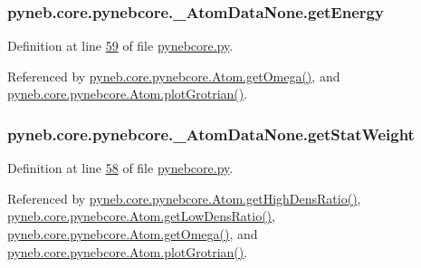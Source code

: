 \hypertarget{classpyneb_1_1core_1_1pynebcore_1_1___atom_data_none_ace59c545d211f79753ebdc9414eb1824}{}
\subsubsection[{get\+Energy}]{\setlength{\rightskip}{0pt plus 5cm}pyneb.\+core.\+pynebcore.\+\_\+\+Atom\+Data\+None.\+get\+Energy}\label{classpyneb_1_1core_1_1pynebcore_1_1___atom_data_none_ace59c545d211f79753ebdc9414eb1824}


Definition at line \hyperlink{pynebcore_8py_source_l00059}{59} of file \hyperlink{pynebcore_8py_source}{pynebcore.\+py}.



Referenced by \hyperlink{pynebcore_8py_source_l01262}{pyneb.\+core.\+pynebcore.\+Atom.\+get\+Omega()}, and \hyperlink{pynebcore_8py_source_l02372}{pyneb.\+core.\+pynebcore.\+Atom.\+plot\+Grotrian()}.

\hypertarget{classpyneb_1_1core_1_1pynebcore_1_1___atom_data_none_a45c07931f008fd0cfc0349222b14cd8c}{}
\subsubsection[{get\+Stat\+Weight}]{\setlength{\rightskip}{0pt plus 5cm}pyneb.\+core.\+pynebcore.\+\_\+\+Atom\+Data\+None.\+get\+Stat\+Weight}\label{classpyneb_1_1core_1_1pynebcore_1_1___atom_data_none_a45c07931f008fd0cfc0349222b14cd8c}


Definition at line \hyperlink{pynebcore_8py_source_l00058}{58} of file \hyperlink{pynebcore_8py_source}{pynebcore.\+py}.



Referenced by \hyperlink{pynebcore_8py_source_l01653}{pyneb.\+core.\+pynebcore.\+Atom.\+get\+High\+Dens\+Ratio()}, \hyperlink{pynebcore_8py_source_l01632}{pyneb.\+core.\+pynebcore.\+Atom.\+get\+Low\+Dens\+Ratio()}, \hyperlink{pynebcore_8py_source_l01262}{pyneb.\+core.\+pynebcore.\+Atom.\+get\+Omega()}, and \hyperlink{pynebcore_8py_source_l02372}{pyneb.\+core.\+pynebcore.\+Atom.\+plot\+Grotrian()}.

